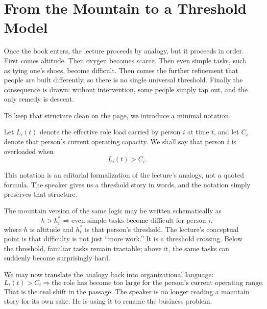 \section{From the Mountain to a Threshold Model}

Once the book enters, the lecture proceeds by analogy, but it proceeds in order. First comes altitude. Then oxygen becomes scarce. Then even simple tasks, such as tying one's shoes, become difficult. Then comes the further refinement that people are built differently, so there is no single universal threshold. Finally the consequence is drawn: without intervention, some people simply tap out, and the only remedy is descent.

To keep that structure clean on the page, we introduce a minimal notation.

\begin{definition}
Let \(L_i(t)\) denote the effective role load carried by person \(i\) at time \(t\), and let \(C_i\) denote that person's current operating capacity. We shall say that person \(i\) is overloaded when
\begin{equation}
L_i(t) > C_i.
\end{equation}
\end{definition}

\begin{remark}
This notation is an editorial formalization of the lecture's analogy, not a quoted formula. The speaker gives us a threshold story in words, and the notation simply preserves that structure.
\end{remark}

The mountain version of the same logic may be written schematically as
\begin{equation}
h > h_i^\ast \Longrightarrow \text{even simple tasks become difficult for person } i,
\end{equation}
where \(h\) is altitude and \(h_i^\ast\) is that person's threshold. The lecture's conceptual point is that difficulty is not just ``more work.'' It is a threshold crossing. Below the threshold, familiar tasks remain tractable; above it, the same tasks can suddenly become surprisingly hard.

We may now translate the analogy back into organizational language:
\begin{equation}
L_i(t) > C_i \Longrightarrow \text{the role has become too large for the person's current operating range.}
\end{equation}
That is the real shift in the passage. The speaker is no longer reading a mountain story for its own sake. He is using it to rename the business problem.


